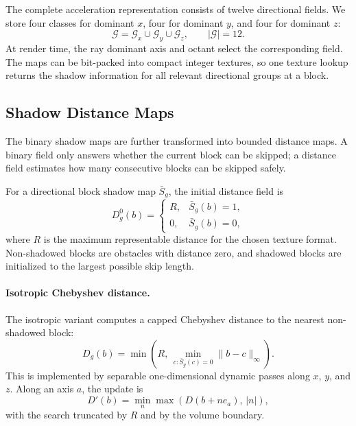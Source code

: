 The complete acceleration representation consists of twelve directional
fields.  We store four classes for dominant \(x\), four for dominant \(y\), and
four for dominant \(z\):
\[
    \mathcal{G}
    =
    \mathcal{G}_x
    \cup
    \mathcal{G}_y
    \cup
    \mathcal{G}_z,
    \qquad
    |\mathcal{G}|=12.
\]
At render time, the ray dominant axis and octant select the corresponding
field.  The maps can be bit-packed into compact integer textures, so one
texture lookup returns the shadow information for all relevant directional
groups at a block.

\subsection{Shadow Distance Maps}
\label{subsec:shadow-distance-maps}

The binary shadow maps are further transformed into bounded distance maps.  A
binary field only answers whether the current block can be skipped; a distance
field estimates how many consecutive blocks can be skipped safely.

For a directional block shadow map \(\bar{S}_g\), the initial distance field is
\[
    D_g^{0}(b)
    =
    \begin{cases}
        R, & \bar{S}_g(b)=1,\\
        0, & \bar{S}_g(b)=0,
    \end{cases}
\]
where \(R\) is the maximum representable distance for the chosen texture
format.  Non-shadowed blocks are obstacles with distance zero, and shadowed
blocks are initialized to the largest possible skip length.

\paragraph{Isotropic Chebyshev distance.}
The isotropic variant computes a capped Chebyshev distance to the nearest
non-shadowed block:
\[
    D_g(b)
    =
    \min\left(
        R,\,
        \min_{c:\bar{S}_g(c)=0}
        \|b-c\|_{\infty}
    \right).
\]
This is implemented by separable one-dimensional dynamic passes along
\(x\), \(y\), and \(z\).  Along an axis \(a\), the update is
\[
    D'(b)
    =
    \min_{n}
    \max\left(D(b+n e_a),\, |n|\right),
\]
with the search truncated by \(R\) and by the volume boundary.

